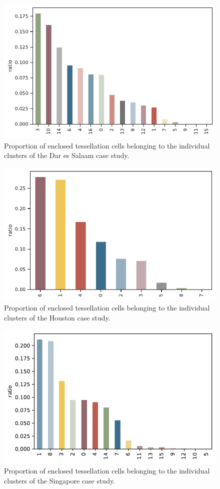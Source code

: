 \begin{figure}
  \includegraphics[width=\linewidth]{figures/counts_des.pdf}
  \caption{Proportion of enclosed tessellation cells belonging to the individual
  clusters of the Dar es Salaam case study. }
  \label{fig:counts_des}
\end{figure}

\begin{figure}
  \includegraphics[width=\linewidth]{figures/counts_hou.pdf}
  \caption{Proportion of enclosed tessellation cells belonging to the individual
  clusters of the Houston case study. }
  \label{fig:counts_hou}
\end{figure}

\begin{figure}
  \includegraphics[width=\linewidth]{figures/counts_sin.pdf}
  \caption{Proportion of enclosed tessellation cells belonging to the individual
  clusters of the Singapore case study. }
  \label{fig:counts_sin}
\end{figure}
